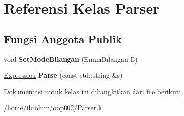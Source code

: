 \hypertarget{classParser}{}\section{Referensi Kelas Parser}
\label{classParser}
\subsection*{Fungsi Anggota Publik}
\begin{DoxyCompactItemize}
\item 
\hypertarget{classParser_a44fc8feda2b68b7bfcba5a3d1a60df8c}{}void {\bfseries Set\+Mode\+Bilangan} (Enum\+Bilangan B)\label{classParser_a44fc8feda2b68b7bfcba5a3d1a60df8c}

\item 
\hypertarget{classParser_a9241f5ed7a2c1959ed0bbb6f333d30eb}{}\hyperlink{classExpression}{Expression} {\bfseries Parse} (const std\+::string \&s)\label{classParser_a9241f5ed7a2c1959ed0bbb6f333d30eb}

\end{DoxyCompactItemize}


Dokumentasi untuk kelas ini dibangkitkan dari file berikut\+:\begin{DoxyCompactItemize}
\item 
/home/ibrohim/oop002/Parser.\+h\end{DoxyCompactItemize}

